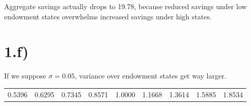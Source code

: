\documentclass{article}
\begin{document}
Aggregate savings actually drops to 19.78, because reduced savings under low
endowment states overwhelms increased savings under high states.

\section*{1.f)}

If we suppose $\sigma=0.05$, variance over endowment states get way larger.

\begin{scriptsize}
\begin{tabular}{lllllllll}
   0.5396  &  0.6295  &  0.7345  &  0.8571   & 1.0000 &   1.1668   & 1.3614   & 1.5885  &  1.8534
\end{tabular}
\end{scriptsize}
\end{document}
